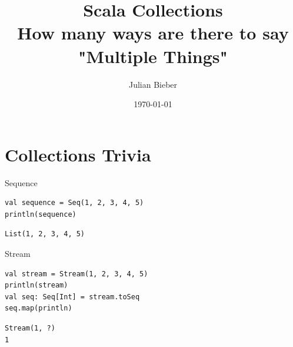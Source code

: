 \documentclass[xcolor=svgnames]{beamer}
\title
[Scala Collections \hspace{2em}]
{Scala Collections \\ How many ways are there to say \\ "Multiple Things"}
\author
[Julian Bieber]
{Julian Bieber}
\date
{\today}
\begin{document}
    \maketitle

    \section{Collections Trivia}

    \begin{frame}[fragile] %
    {Sequence}
        \begin{Verbatim}[formatcom=\sffamily]
val sequence = Seq(1, 2, 3, 4, 5)
println(sequence)
        \end{Verbatim}

        \noindent\makebox[\linewidth]{\rule{\paperwidth}{0.4pt}}

        \pause

        \begin{Verbatim}[formatcom=\sffamily]
List(1, 2, 3, 4, 5)
        \end{Verbatim}
    \end{frame}

    \begin{frame}[fragile] %
    {Stream}
        \begin{Verbatim}[formatcom=\sffamily]
val stream = Stream(1, 2, 3, 4, 5)
println(stream)
val seq: Seq[Int] = stream.toSeq
seq.map(println)
        \end{Verbatim}

        \noindent\makebox[\linewidth]{\rule{\paperwidth}{0.4pt}}

        \pause

        \begin{Verbatim}[formatcom=\sffamily]
Stream(1, ?)
1
        \end{Verbatim}
    \end{frame}
\end{document}
